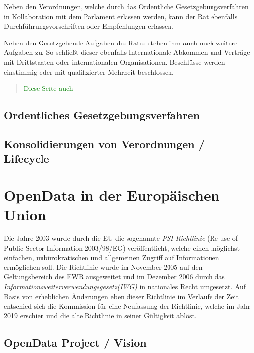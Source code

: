 Neben den Verordnungen, welche durch das Ordentliche Gesetzgebungsverfahren in Kollaboration mit dem Parlament erlassen werden, kann der Rat ebenfalls Durchführungsvorschriften oder Empfehlungen erlassen.

Neben den Gesetzgebende Aufgaben des Rates stehen ihm auch noch weitere Aufgaben zu. So schließt dieser ebenfalls Internationale Abkommen und Verträge mit Drittstaaten oder internationalen Organisationen. 
Beschlüsse werden einstimmig oder mit qualifizierter Mehrheit beschlossen.


    
            \pagebreak    
        
            
\begin{quote}
\textcolor{green}{Diese Seite auch}
\end{quote}
            \pagebreak    
        \subsection{Ordentliches Gesetzgebungsverfahren}
            \pagebreak    
        
        \subsection{Konsolidierungen von Verordnungen / Lifecycle}
            \pagebreak    
        

    \section{OpenData in der Europäischen Union}

Die Jahre 2003 wurde durch die EU die sogenannte \textit{PSI-Richtlinie} (Re-use of Public Sector Information 2003/98/EG) veröffentlicht, welche einen möglichst einfachen, unbürokratischen und allgemeinen Zugriff auf Informationen ermöglichen soll.
Die Richtlinie wurde im November 2005 auf den Geltungsbereich des EWR ausgeweitet\cite{2005D0105} und im Dezember 2006 durch das \textit{Informationsweiterverwendungsgesetz(IWG)} in nationales Recht umgesetzt.
Auf Basis von erheblichen Änderungen eben dieser Richtlinie im Verlaufe der Zeit entschied sich die Kommission für eine Neufassung der Richtlinie, welche im Jahr 2019 erschien und die alte Richtlinie in seiner Gültigkeit ablöst. \cite[Prä. Abs. 1ff.]{2003L0098}



        
        \subsection{OpenData Project / Vision}

